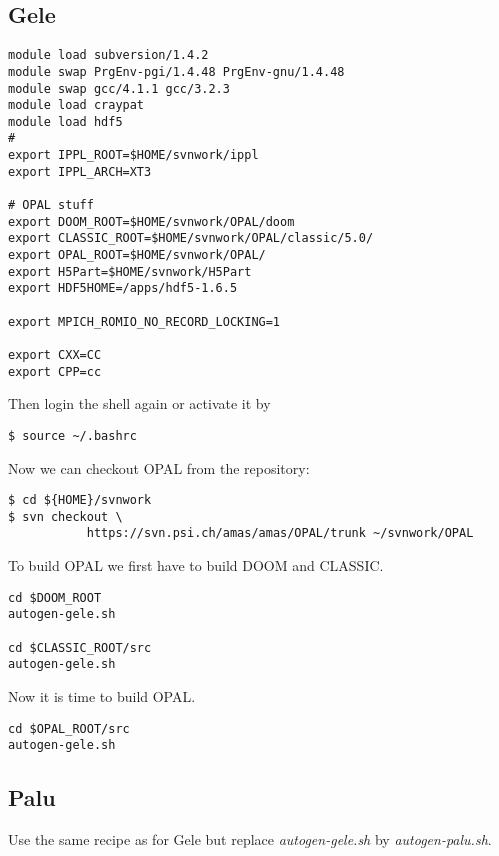 \subsection{Gele}

\begin{footnotesize}
\begin{verbatim}
module load subversion/1.4.2
module swap PrgEnv-pgi/1.4.48 PrgEnv-gnu/1.4.48
module swap gcc/4.1.1 gcc/3.2.3
module load craypat
module load hdf5
#
export IPPL_ROOT=$HOME/svnwork/ippl
export IPPL_ARCH=XT3

# OPAL stuff
export DOOM_ROOT=$HOME/svnwork/OPAL/doom
export CLASSIC_ROOT=$HOME/svnwork/OPAL/classic/5.0/
export OPAL_ROOT=$HOME/svnwork/OPAL/
export H5Part=$HOME/svnwork/H5Part
export HDF5HOME=/apps/hdf5-1.6.5

export MPICH_ROMIO_NO_RECORD_LOCKING=1

export CXX=CC
export CPP=cc
\end{verbatim}
\end{footnotesize}

Then login the shell again or activate it by 
\begin{footnotesize}
\begin{verbatim}
$ source ~/.bashrc
\end{verbatim}
\end{footnotesize}
Now we can checkout OPAL from the repository: 

\begin{footnotesize}
\begin{verbatim}
$ cd ${HOME}/svnwork
$ svn checkout \
           https://svn.psi.ch/amas/amas/OPAL/trunk ~/svnwork/OPAL
\end{verbatim}
\end{footnotesize}
To build OPAL we first have to build DOOM and CLASSIC. 

\begin{footnotesize}
\begin{verbatim}
cd $DOOM_ROOT
autogen-gele.sh

cd $CLASSIC_ROOT/src
autogen-gele.sh
\end{verbatim}
\end{footnotesize}
Now it is time to build OPAL.
\begin{footnotesize}
\begin{verbatim}
cd $OPAL_ROOT/src
autogen-gele.sh
\end{verbatim}
\end{footnotesize}

\subsection{Palu}
Use the same recipe as for Gele but replace  {\em autogen-gele.sh} by {\em autogen-palu.sh}.

